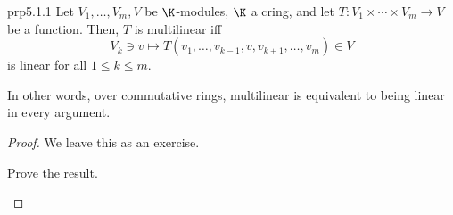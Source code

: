 \begin{prp}{}{prp5.1.1}
	Let $V_1,\ldots ,V_m,V$ be $\K$-modules, $\K$ a cring, and let $T\colon V_1\times \cdots \times V_m\rightarrow V$ be a function.  Then, $T$ is multilinear iff
	\begin{equation}
	V_k\ni v\mapsto T(v_1,\ldots ,v_{k-1},v,v_{k+1},\ldots ,v_m)\in V
	\end{equation}
	is linear for all $1\leq k\leq m$.
	\begin{rmk}
		In other words, over commutative rings, multilinear is equivalent to being linear in every argument.
	\end{rmk}
	\begin{proof}
		We leave this as an exercise.
		\begin{exr}[breakable=false]{}{}
			Prove the result.
		\end{exr}
	\end{proof}
\end{prp}
